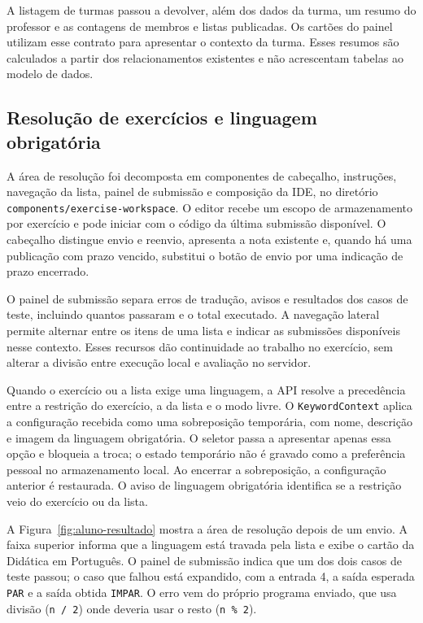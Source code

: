 A listagem de turmas passou a devolver, além dos dados da turma, um resumo do professor e as contagens de membros e listas publicadas. Os cartões do painel utilizam esse contrato para apresentar o contexto da turma. Esses resumos são calculados a partir dos relacionamentos existentes e não acrescentam tabelas ao modelo de dados.

\subsection{Resolução de exercícios e linguagem obrigatória}

A área de resolução foi decomposta em componentes de cabeçalho, instruções, navegação da lista, painel de submissão e composição da IDE, no diretório \texttt{components/exercise-workspace}. O editor recebe um escopo de armazenamento por exercício e pode iniciar com o código da última submissão disponível. O cabeçalho distingue envio e reenvio, apresenta a nota existente e, quando há uma publicação com prazo vencido, substitui o botão de envio por uma indicação de prazo encerrado.

O painel de submissão separa erros de tradução, avisos e resultados dos casos de teste, incluindo quantos passaram e o total executado. A navegação lateral permite alternar entre os itens de uma lista e indicar as submissões disponíveis nesse contexto. Esses recursos dão continuidade ao trabalho no exercício, sem alterar a divisão entre execução local e avaliação no servidor.

Quando o exercício ou a lista exige uma linguagem, a API resolve a precedência entre a restrição do exercício, a da lista e o modo livre. O \texttt{KeywordContext} aplica a configuração recebida como uma sobreposição temporária, com nome, descrição e imagem da linguagem obrigatória. O seletor passa a apresentar apenas essa opção e bloqueia a troca; o estado temporário não é gravado como a preferência pessoal no armazenamento local. Ao encerrar a sobreposição, a configuração anterior é restaurada. O aviso de linguagem obrigatória identifica se a restrição veio do exercício ou da lista.

A Figura~\ref{fig:aluno-resultado} mostra a área de resolução depois de um envio. A faixa superior informa que a linguagem está travada pela lista e exibe o cartão da Didática em Português. O painel de submissão indica que um dos dois casos de teste passou; o caso que falhou está expandido, com a entrada 4, a saída esperada \texttt{PAR} e a saída obtida \texttt{IMPAR}. O erro vem do próprio programa enviado, que usa divisão (\texttt{n / 2}) onde deveria usar o resto (\texttt{n \% 2}).

